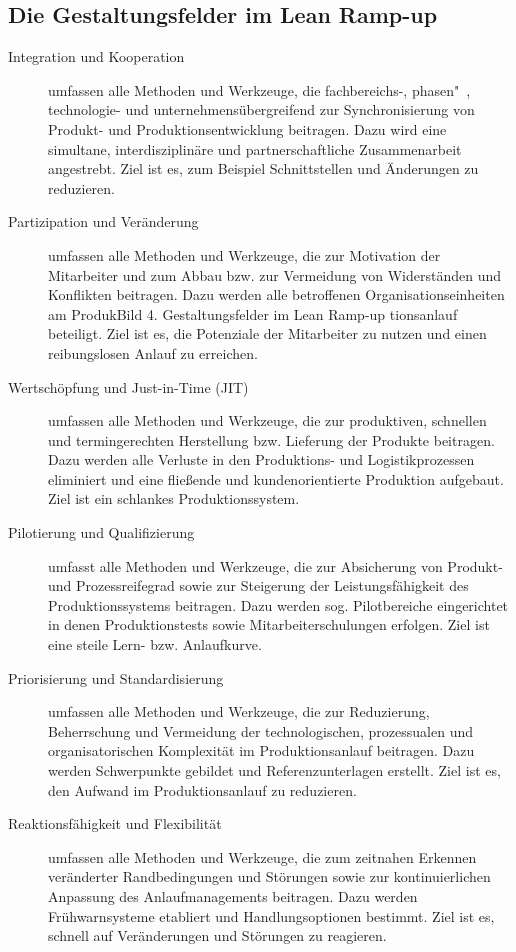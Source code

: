 \subsection*{Die Gestaltungsfelder im Lean Ramp-up}\label{appendix:dom11a:gf}
\begin{description}
\item[Integration und Kooperation] umfassen
alle Methoden und Werkzeuge, die
fachbereichs-, phasen"~, technologie- und unternehmensübergreifend zur
Synchronisierung von Produkt- und
Produktionsentwicklung beitragen.
Dazu wird eine simultane, interdisziplinäre und partnerschaftliche Zusammenarbeit angestrebt. Ziel ist es,
zum Beispiel Schnittstellen und Änderungen zu reduzieren.

\item[Partizipation und Veränderung] umfassen alle Methoden und Werkzeuge,
die zur Motivation der Mitarbeiter
und zum Abbau bzw. zur Vermeidung
von Widerständen und Konflikten beitragen. Dazu werden alle betroffenen
Organisationseinheiten am ProdukBild 4. Gestaltungsfelder im Lean Ramp-up
tionsanlauf beteiligt. Ziel ist es, die
Potenziale der Mitarbeiter zu nutzen
und einen reibungslosen Anlauf zu erreichen.

 \item[Wertschöpfung und Just-in-Time (JIT)]
umfassen alle Methoden und Werkzeuge, die zur produktiven, schnellen
und termingerechten Herstellung
bzw. Lieferung der Produkte beitragen. Dazu werden alle Verluste in den
Produktions- und Logistikprozessen
eliminiert und eine fließende und
kundenorientierte Produktion aufgebaut. Ziel ist ein schlankes Produktionssystem.

 \item[Pilotierung und Qualifizierung] umfasst
alle Methoden und Werkzeuge, die
zur Absicherung von Produkt- und
Prozessreifegrad sowie zur Steigerung der Leistungsfähigkeit des Produktionssystems beitragen. Dazu
werden sog. Pilotbereiche eingerichtet in denen Produktionstests sowie
Mitarbeiterschulungen erfolgen. Ziel
ist eine steile Lern- bzw. Anlaufkurve.

 \item[Priorisierung und Standardisierung]
umfassen alle Methoden und Werkzeuge, die zur Reduzierung, Beherrschung und Vermeidung der technologischen, prozessualen und organisatorischen Komplexität im Produktionsanlauf beitragen. Dazu werden
Schwerpunkte gebildet und Referenzunterlagen erstellt. Ziel ist es, den
Aufwand im Produktionsanlauf zu reduzieren.

 \item[Reaktionsfähigkeit und Flexibilität] umfassen alle Methoden und Werkzeuge,
die zum zeitnahen Erkennen veränderter Randbedingungen und Störungen sowie zur kontinuierlichen Anpassung des Anlaufmanagements beitragen. Dazu werden Frühwarnsysteme etabliert und Handlungsoptionen
bestimmt. Ziel ist es, schnell auf Veränderungen und Störungen zu reagieren.


\end{description}
